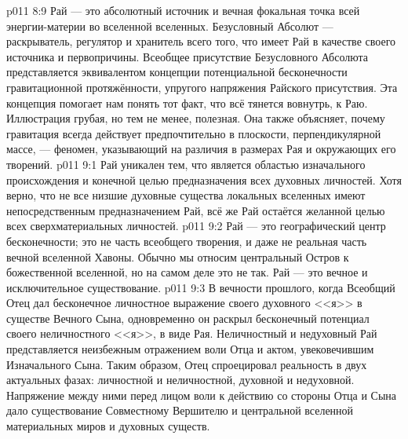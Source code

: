 \vs p011 8:9 Рай --- это абсолютный источник и вечная фокальная точка всей энергии\hyp{}материи во вселенной вселенных. Безусловный Абсолют --- раскрыватель, регулятор и хранитель всего того, что имеет Рай в качестве своего источника и первопричины. Всеобщее присутствие Безусловного Абсолюта представляется эквивалентом концепции потенциальной бесконечности гравитационной протяжённости, упругого напряжения Райского присутствия. Эта концепция помогает нам понять тот факт, что всё тянется вовнутрь, к Раю. Иллюстрация грубая, но тем не менее, полезная. Она также объясняет, почему гравитация всегда действует предпочтительно в плоскости, перпендикулярной массе, --- феномен, указывающий на различия в размерах Рая и окружающих его творений.
\vs p011 9:1 Рай уникален тем, что является областью изначального происхождения и конечной целью предназначения всех духовных личностей. Хотя верно, что не все низшие духовные существа локальных вселенных имеют непосредственным предназначением Рай, всё же Рай остаётся желанной целью всех сверхматериальных личностей.
\vs p011 9:2 \pc Рай --- это географический центр бесконечности; это не часть всеобщего творения, и даже не реальная часть вечной вселенной Хавоны. Обычно мы относим центральный Остров к божественной вселенной, но на самом деле это не так. Рай --- это вечное и исключительное существование.
\vs p011 9:3 \pc В вечности прошлого, когда Всеобщий Отец дал бесконечное личностное выражение своего духовного <<я>> в существе Вечного Сына, одновременно он раскрыл бесконечный потенциал своего неличностного <<я>>, в виде Рая. Неличностный и недуховный Рай представляется неизбежным отражением воли Отца и актом, увековечившим Изначального Сына. Таким образом, Отец спроецировал реальность в двух актуальных фазах: личностной и неличностной, духовной и недуховной. Напряжение между ними перед лицом воли к действию со стороны Отца и Сына дало существование Совместному Вершителю и центральной вселенной материальных миров и духовных существ.
